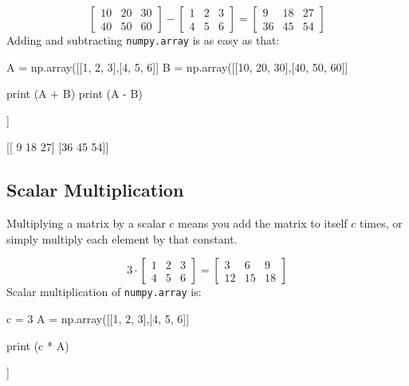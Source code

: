 \begin{equation*}
\begin{bmatrix}
10 & 20 & 30\\
40 & 50 & 60
\end{bmatrix}
-
\begin{bmatrix}
1 & 2 & 3 \\
4 & 5 & 6
\end{bmatrix}
=
\begin{bmatrix}
9 & 18 & 27\\
36 & 45 & 54
\end{bmatrix}
\end{equation*}
Adding and subtracting \texttt{numpy.array} is as easy as that:

\begin{ipython}
A = np.array([[1, 2, 3],[4, 5, 6]]
B = np.array([[10, 20, 30],[40, 50, 60]]

print (A + B)
print (A - B)
\end{ipython}
\begin{ioutput}
[[11 22 33]
 [44 55 66]]
 
[[ 9 18 27]
 [36 45 54]]
\end{ioutput}

\subsection{Scalar Multiplication}\label{scalar-multiplication}

Multiplying a matrix by a scalar $c$ means you add the matrix to itself $c$ times, or simply multiply each element by that constant.

\begin{equation*}
3 \cdot
\begin{bmatrix}
1 & 2 & 3 \\
4 & 5 & 6
\end{bmatrix}
=
\begin{bmatrix}
3 & 6 & 9 \\
12 & 15 & 18
\end{bmatrix}
\end{equation*}
Scalar multiplication of \texttt{numpy.array} is:

\begin{ipython}
c = 3
A = np.array([[1, 2, 3],[4, 5, 6]]

print (c * A)
\end{ipython}
\begin{ioutput}
[[ 3  6  9]
 [12 15 18]]
\end{ioutput}

